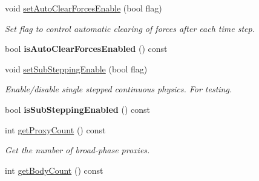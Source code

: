 \begin{DoxyCompactItemize}
\item 
void \hyperlink{class_i_dream_sky_1_1_physics3_1_1_world_ab73ba667118e9ed6018dba64fd847a75}{set\+Auto\+Clear\+Forces\+Enable} (bool flag)\hypertarget{class_i_dream_sky_1_1_physics3_1_1_world_ab73ba667118e9ed6018dba64fd847a75}{}\label{class_i_dream_sky_1_1_physics3_1_1_world_ab73ba667118e9ed6018dba64fd847a75}

\begin{DoxyCompactList}\small\item\em Set flag to control automatic clearing of forces after each time step. \end{DoxyCompactList}\item 
bool {\bfseries is\+Auto\+Clear\+Forces\+Enabled} () const \hypertarget{class_i_dream_sky_1_1_physics3_1_1_world_a2a4c56d05599da4746112ecee4cb55c1}{}\label{class_i_dream_sky_1_1_physics3_1_1_world_a2a4c56d05599da4746112ecee4cb55c1}

\item 
void \hyperlink{class_i_dream_sky_1_1_physics3_1_1_world_ae4dfd7498d387f48308daec72f02da6a}{set\+Sub\+Stepping\+Enable} (bool flag)\hypertarget{class_i_dream_sky_1_1_physics3_1_1_world_ae4dfd7498d387f48308daec72f02da6a}{}\label{class_i_dream_sky_1_1_physics3_1_1_world_ae4dfd7498d387f48308daec72f02da6a}

\begin{DoxyCompactList}\small\item\em Enable/disable single stepped continuous physics. For testing. \end{DoxyCompactList}\item 
bool {\bfseries is\+Sub\+Stepping\+Enabled} () const \hypertarget{class_i_dream_sky_1_1_physics3_1_1_world_aab8695a620eda83782519911a9359ef1}{}\label{class_i_dream_sky_1_1_physics3_1_1_world_aab8695a620eda83782519911a9359ef1}

\item 
int \hyperlink{class_i_dream_sky_1_1_physics3_1_1_world_a65b832fbab2e319bd1c01ec5770f08fc}{get\+Proxy\+Count} () const \hypertarget{class_i_dream_sky_1_1_physics3_1_1_world_a65b832fbab2e319bd1c01ec5770f08fc}{}\label{class_i_dream_sky_1_1_physics3_1_1_world_a65b832fbab2e319bd1c01ec5770f08fc}

\begin{DoxyCompactList}\small\item\em Get the number of broad-\/phase proxies. \end{DoxyCompactList}\item 
int \hyperlink{class_i_dream_sky_1_1_physics3_1_1_world_ad9817d4d75da582880fd3b5d316cc7e0}{get\+Body\+Count} () const \hypertarget{class_i_dream_sky_1_1_physics3_1_1_world_ad9817d4d75da582880fd3b5d316cc7e0}{}\label{class_i_dream_sky_1_1_physics3_1_1_world_ad9817d4d75da582880fd3b5d316cc7e0}


\end{DoxyCompactItemize}
